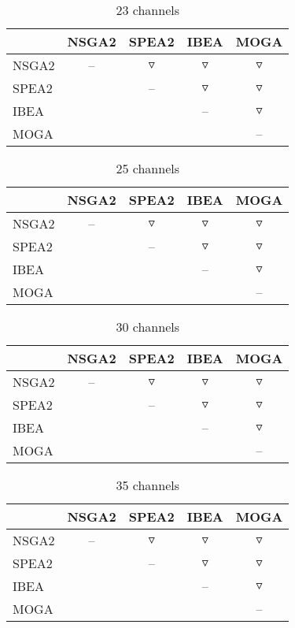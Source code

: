 \documentclass{article}
\begin{document}
    \begin{table}
     \caption {23 channels} \label{tab:title} 
    \centering \begin{tabular}{l c c c c }
     \hline & NSGA2 & SPEA2 & IBEA & MOGA \\
    \hline  NSGA2 &  --  & $\triangledown$ & $\triangledown$ & $\triangledown$ \\
     SPEA2 &   &  --  & $\triangledown$ & $\triangledown$ \\
     IBEA &   &   &  --  & $\triangledown$ \\
     MOGA &   &   &   &  --  \\
    \hline
    \end{tabular}
    \end{table}
     \begin{table}
      \caption {25 channels} \label{tab:title} 
     \centering \begin{tabular}{l c c c c }
      \hline & NSGA2 & SPEA2 & IBEA & MOGA \\
     \hline  NSGA2 &  --  & $\triangledown$ & $\triangledown$ & $\triangledown$ \\
      SPEA2 &   &  --  & $\triangledown$ & $\triangledown$ \\
      IBEA &   &   &  --  & $\triangledown$ \\
      MOGA &   &   &   &  --  \\
     \hline
     \end{tabular}
     \end{table}
      \begin{table}
       \caption {30 channels} \label{tab:title} 
      \centering \begin{tabular}{l c c c c }
       \hline & NSGA2 & SPEA2 & IBEA & MOGA \\
      \hline  NSGA2 &  --  & $\triangledown$ & $\triangledown$ & $\triangledown$ \\
       SPEA2 &   &  --  & $\triangledown$ & $\triangledown$ \\
       IBEA &   &   &  --  & $\triangledown$ \\
       MOGA &   &   &   &  --  \\
      \hline
      \end{tabular}
      \end{table}
       \begin{table}
        \caption {35 channels} \label{tab:title} 
       \centering \begin{tabular}{l c c c c }
        \hline & NSGA2 & SPEA2 & IBEA & MOGA \\
       \hline  NSGA2 &  --  & $\triangledown$ & $\triangledown$ & $\triangledown$ \\
        SPEA2 &   &  --  & $\triangledown$ & $\triangledown$ \\
        IBEA &   &   &  --  & $\triangledown$ \\
        MOGA &   &   &   &  --  \\
       \hline
       \end{tabular}
       \end{table}
 
\end{document}
